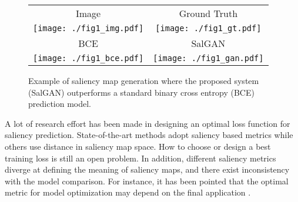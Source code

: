 \documentclass[times,twocolumn,final,authoryear]{elsarticle}
\begin{document}
\begin{figure}
\centering
\begin{tabular}{cc}
Image & Ground Truth \\
\texttt{[image: ./fig1\_img.pdf]} &     \texttt{[image: ./fig1\_gt.pdf]} \\
BCE & SalGAN  \\
\texttt{[image: ./fig1\_bce.pdf]} &     \texttt{[image: ./fig1\_gan.pdf]} \\
\end{tabular}
\caption{Example of saliency map generation where the proposed system (SalGAN) outperforms a standard binary cross entropy (BCE) prediction model.}
\label{fig:catchyFigure}
\end{figure}
A lot of research effort has been made in designing an optimal loss function for saliency prediction. State-of-the-art methods \citep{huang2015salicon} adopt saliency based metrics while others \citep{Pan_2016_CVPR,mlnet2016,jetley2016end,sun2017integrated} use distance in saliency map space. How to choose or design a best training loss is still an open problem. In addition, different saliency metrics diverge at defining the meaning of saliency maps, and there exist inconsistency with the model comparison. For instance, it has been pointed that the optimal metric for model optimization may depend on the final application  \citep{Bylinskii2016metrics}.
\end{document}
